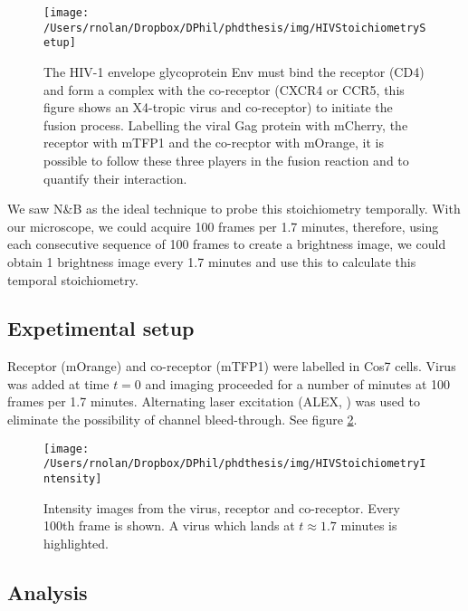 \documentclass[12pt,]{book}
\theoremstyle{definition}
\theoremstyle{definition}
\theoremstyle{definition}
\theoremstyle{remark}
\begin{document}
\begin{figure}

\texttt{[image: /Users/rnolan/Dropbox/DPhil/phdthesis/img/HIVStoichiometrySetup]} \hfill{}

\caption{The HIV-1 envelope glycoprotein Env
must bind the receptor (CD4) and form a complex with the co-receptor
(CXCR4 or CCR5, this figure shows an X4-tropic virus and co-receptor) to
initiate the fusion process. Labelling the viral Gag protein with
mCherry, the receptor with mTFP1 and the co-recptor with mOrange, it is
possible to follow these three players in the fusion reaction and to
quantify their interaction.}\label{fig:HIVStoichiometrySetup}
\end{figure}

We saw N\&B as the ideal technique to probe this stoichiometry
temporally. With our microscope, we could acquire 100 frames per 1.7
minutes, therefore, using each consecutive sequence of 100 frames to
create a brightness image, we could obtain 1 brightness image every 1.7
minutes and use this to calculate this temporal stoichiometry.

\subsection{Expetimental setup}\label{expetimental-setup}

Receptor (mOrange) and co-receptor (mTFP1) were labelled in Cos7 cells.
Virus was added at time \(t=0\) and imaging proceeded for a number of
minutes at 100 frames per 1.7 minutes. Alternating laser excitation
(ALEX, \citet{ALEX}) was used to eliminate the possibility of channel
bleed-through. See figure \ref{fig:HIVStoichiometryIntensity}.





\begin{figure}

\texttt{[image: /Users/rnolan/Dropbox/DPhil/phdthesis/img/HIVStoichiometryIntensity]} \hfill{}

\caption{Intensity images from the virus,
receptor and co-receptor. Every 100th frame is shown. A virus which
lands at \(t \approx 1.7\) minutes is highlighted.}\label{fig:HIVStoichiometryIntensity}
\end{figure}

\subsection{Analysis}\label{analysis}
\end{document}
